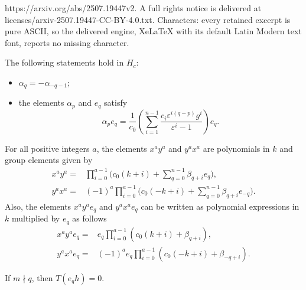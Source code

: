 \documentclass[10pt,a4paper]{amsart}
\newcommand\eps{\varepsilon}
\begin{document}
https://arxiv.org/abs/2507.19447v2. A full rights notice is delivered at licenses/arxiv-2507.19447-CC-BY-4.0.txt. Characters: every retained excerpt is pure ASCII, so the delivered engine, XeLaTeX with its default Latin Modern text font, reports no missing character.
\begin{Lemma}
 \label{lem:a_prop}
 The following statements hold in $H_c$:
 \begin{itemize}\itemsep=0pt
 \item $\alpha_q = -\alpha_{-q - 1}$;
 \item the elements $\alpha_p$ and $e_q$ satisfy
 \begin{equation*}
 \alpha_p e_q = \frac1{c_0}
 \left( \sum_{i = 1}^{n - 1}
 \frac{c_i \eps^{i(q - p)} g^i}{\eps^i - 1}
 \right) e_q.
 \end{equation*}
 \end{itemize}
\end{Lemma}

\begin{Lemma}
 \label{lem:xy_poly}
 For all positive integers $a$,
 the elements $x^a y^a$ and $y^a x^a$
 are polynomials in $k$ and group elements
 given by
 \begin{align*}
 x^a y^a ={}& \prod_{i = 0}^{a - 1} \Bigg( c_0 (k + i)
 + \sum\limits_{q = 0}^{n - 1} \beta_{q + i} e_q \Bigg),
 \\
 y^a x^a ={}& (-1)^a \prod\limits_{i = 0}^{a - 1}
 \Bigg( c_0 (-k + i)
 + \sum\limits_{q = 0}^{n - 1} \beta_{q + i} e_{-q}
 \Bigg).
 \end{align*}
 Also, the elements $x^a y^a e_q$ and $y^a x^a e_q$
 can be written as polynomial expressions in $k$
 multiplied by $e_q$ as follows
 \begin{align*}
 x^a y^a e_q ={}& e_q \prod\limits_{i = 0}^{a - 1}
 (c_0 (k + i) + \beta_{q + i}), \\
 y^a x^a e_q ={}& (-1)^a e_q \prod\limits_{i = 0}^{a - 1}
 (c_0 (-k + i) + \beta_{-q + i}).
 \end{align*}
\end{Lemma}

\begin{Lemma}
 \label{lem:trace_eh_zero}
 If $m \nmid q$, then $T(e_q h) = 0$.
\end{Lemma}
\end{document}
